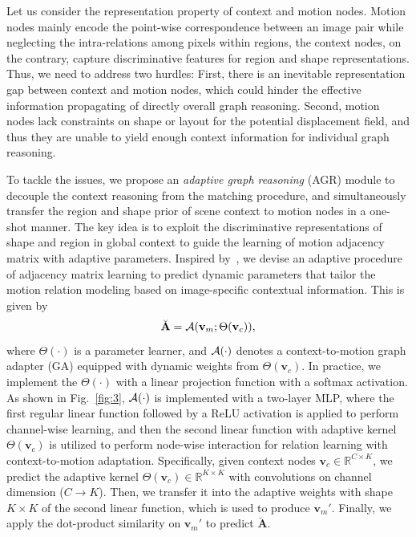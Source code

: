 \documentclass[letterpaper]{article} %
\begin{document}
Let us consider the representation property of context and motion nodes. Motion nodes mainly encode the point-wise correspondence between an image pair while neglecting the intra-relations among pixels within regions, the context nodes, on the contrary, capture discriminative features for region and shape representations. Thus, we need to address two hurdles: First, 
there is an inevitable representation gap between context and motion nodes, which could hinder the effective information propagating of directly overall graph reasoning. Second, motion nodes lack constraints on shape or layout for the potential displacement field, and thus they are unable to yield enough context information for individual graph reasoning.

To tackle the issues, we propose an {\em adaptive graph reasoning} (AGR) module to decouple the context reasoning from the matching procedure, and simultaneously transfer the region and shape prior of scene context to motion nodes in a one-shot manner. The key idea is to exploit the discriminative representations of shape and region in global context to guide the learning of motion adjacency matrix with adaptive parameters. Inspired by~\cite{Bertinetto2016LearningFO}, we devise an adaptive procedure of adjacency matrix learning to predict dynamic parameters that tailor the motion relation modeling based on image-specific contextual information. This is given by 
\begin{equation}
	\breve{\mathbf A} = {\cal A}({\mathbf v}_m ; \Theta({\mathbf v}_c)),
\end{equation}
where $\Theta(\cdot)$ is a parameter learner, and ${\cal A}(\cdot)$ denotes a context-to-motion graph adapter (GA) equipped with dynamic weights from $\Theta({\mathbf v}_c)$. In practice, we implement the $\Theta(\cdot)$ with a linear projection function with a softmax activation. As shown in Fig.~\ref{fig:3}, ${\cal A}(\cdot)$ is implemented with a two-layer MLP, where the first regular linear function followed by a ReLU activation is applied to perform channel-wise learning, and then the second linear function with adaptive kernel $\Theta({\mathbf v}_c)$ is utilized to perform node-wise interaction for relation learning with context-to-motion adaptation. Specifically, given context nodes ${\mathbf v}_c \in \mathbb{R}^{C \times K}$, we predict the adaptive kernel $\Theta({\mathbf v}_c) \in \mathbb{R}^{K \times K}$ with convolutions on channel dimension ($C \rightarrow K$). Then, we transfer it into the adaptive weights with shape $K \times K$ of the second linear function, which is used to produce ${{\mathbf v}_m}'$. Finally, we apply the dot-product similarity on ${{\mathbf v}_m}'$ to predict $\breve{\mathbf A}$.
\end{document}
